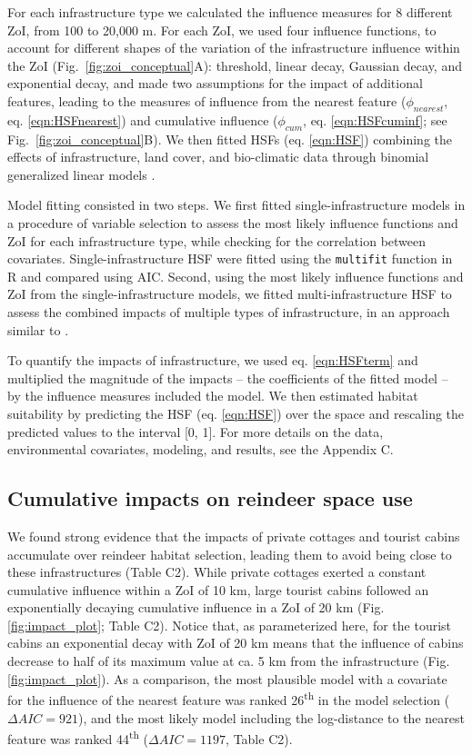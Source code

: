 \documentclass[titlepage]{article}
\begin{document}
For each infrastructure type we calculated the influence measures for 8 different ZoI, from 100 to 20,000 m. For each ZoI, we used four influence functions, to account for different shapes of the variation of the infrastructure influence within the ZoI (Fig.~\ref{fig:zoi_conceptual}A): threshold, linear decay, Gaussian decay, and exponential decay, and made two assumptions for the impact of additional features, leading to the measures of influence from the nearest feature ($\phi_{nearest}$, eq. \ref{eqn:HSFnearest}) and cumulative influence ($\phi_{cum}$, eq. \ref{eqn:HSFcuminf}; see Fig.~\ref{fig:zoi_conceptual}B). We then fitted HSFs (eq. \ref{eqn:HSF}) combining the effects of infrastructure, land cover, and bio-climatic data through binomial generalized linear models \citep{fieberg_how_2021}. 

Model fitting consisted in two steps. We first fitted single-infrastructure models in a procedure of variable selection \citep{burnham_model_2002} to assess the most likely influence functions and ZoI for each infrastructure type, while checking for the correlation between covariates. Single-infrastructure HSF were fitted using the \verb|multifit| function in R \citep{huais_multifit_2018} and compared using AIC. Second, using the most likely influence functions and ZoI from the single-infrastructure models, we fitted multi-infrastructure HSF to assess the combined impacts of multiple types of infrastructure, in an approach similar to \citet{laforge_process-focussed_2015}. 

To quantify the impacts of infrastructure, we used eq. \ref{eqn:HSFterm} and multiplied the magnitude of the impacts -- the coefficients of the fitted model -- by the influence measures included the model. We then estimated habitat suitability by predicting the HSF (eq. \ref{eqn:HSF}) over the space and rescaling the predicted values to the interval [0, 1]. For more details on the data, environmental covariates, modeling, and results, see the Appendix C.

\subsection{Cumulative impacts on reindeer space use}

We found strong evidence that the impacts of private cottages and tourist cabins accumulate over reindeer habitat selection, leading them to avoid being close to these infrastructures (Table C2). While private cottages exerted a constant cumulative influence within a ZoI of 10 km, large tourist cabins followed an exponentially decaying cumulative influence in a ZoI of 20 km (Fig. \ref{fig:impact_plot}; Table C2). Notice that, as parameterized here, for the tourist cabins an exponential decay with ZoI of 20 km means
that the influence of cabins decrease to half of its maximum value
at ca. 5 km from the infrastructure (Fig. \ref{fig:impact_plot}). As a comparison, the most plausible model with a covariate for the influence of the nearest feature was ranked 26\textsuperscript{th} in the model selection ($\Delta AIC = 921$), and the most likely model including the log-distance to the nearest feature was ranked 44\textsuperscript{th} ($\Delta AIC = 1197$, Table C2).
\end{document}
